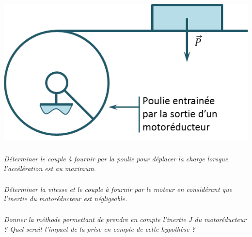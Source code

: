 \documentclass[10pt,fleqn]{article} %
\begin{document}
\begin{multicols}{2}
\begin{center}
\includegraphics[width=.9\linewidth]{images/fig_12}
\end{center}

\subparagraph{}
\textit{Déterminer le couple à fournir par la poulie pour déplacer la charge lorsque l'accélération est au maximum. }
\ifprof
\begin{corrige}
\end{corrige}
\else
\fi


\subparagraph{}
\textit{Déterminer la vitesse et le couple à fournir par le moteur en considérant que l'inertie du motoréducteur est négligeable. }
\ifprof
\begin{corrige}
\end{corrige}
\else
\fi


\subparagraph{}
\textit{Donner la méthode permettant de prendre en compte l'inertie $J$ du motoréducteur ? Quel serait l'impact de la prise en compte de cette hypothèse ? }
\ifprof
\begin{corrige}
\end{corrige}
\else
\fi

%
%
%
%
%
%
%
%
%

\end{multicols}
\end{document}
